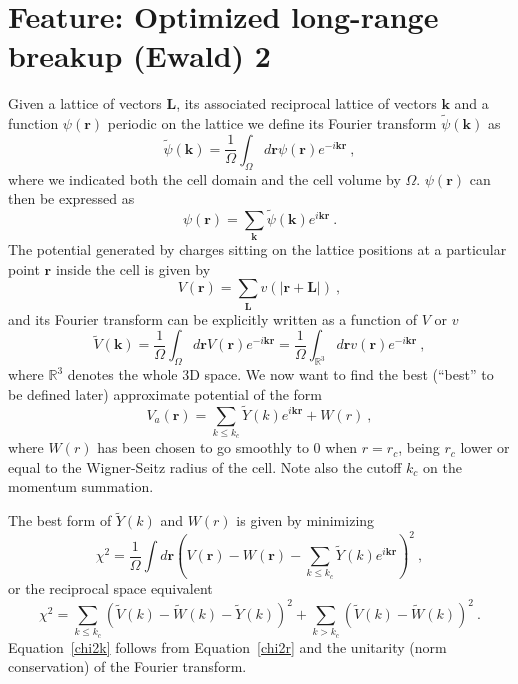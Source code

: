 %
\section{Feature: Optimized long-range breakup (Ewald) 2}


\newcommand{\rv}{\mathbf{r}}
\newcommand{\kv}{\mathbf{k}}
\newcommand{\Rv}{\mathbf{R}}
\newcommand{\Lv}{\mathbf{L}}
\newcommand{\Rc}{\mathcal{R}}
\newcommand{\tV}{\widetilde{V}}
\newcommand{\tW}{\widetilde{W}}
\newcommand{\tc}{\widetilde{c}}
\newcommand{\tY}{\widetilde{Y}}
\newcommand{\Nk}{N_{\text{knot}}}
\newcommand{\wk}{w_{\text{knot}}}

Given a lattice of vectors $\Lv$, its associated reciprocal
lattice of vectors $\kv$ and a function $\psi(\rv)$ periodic
on the lattice we define its Fourier transform $\widetilde{\psi}(\kv)$ as
\begin{equation}
\widetilde{\psi}(\kv)=\frac{1}{\Omega}\int_\Omega d\rv \psi(\rv) e^{-i\kv\rv}\:,
\end{equation}
where we indicated both the cell domain and the cell volume by $\Omega$. 
$\psi(\rv)$ can then be expressed as
\begin{equation}
\psi(\rv)=\sum_{\kv} \widetilde{\psi}(\kv)e^{i\kv\rv}\:.
\end{equation}
The potential generated by charges sitting on the lattice positions
at a particular point $\rv$ inside the cell is given by
\begin{equation}
V(\rv)=\sum_{\Lv}v(|\rv+\Lv|)\:,
\end{equation}
and its Fourier transform can be explicitly written as a function of $V$ or $v$
\begin{equation}
\widetilde{V}(\kv)=\frac{1}{\Omega}\int_\Omega d\rv V(\rv) e^{-i\kv\rv}=
\frac{1}{\Omega}\int_{\mathbb{R}^3} d\rv v(\rv) e^{-i\kv\rv}\:,
\end{equation}
where $\mathbb{R}^3$ denotes the whole 3D space.
We now want to find the best (``best'' to be defined later) approximate 
potential of the form
\begin{equation}
V_a(\rv)=\sum_{k\le k_c} \widetilde{Y}(k) e^{i\kv\rv} + W(r)\:,
\end{equation}
where $W(r)$ has been chosen to go smoothly to $0$ when $r=r_c$, being
$r_c$ lower or equal to the Wigner-Seitz radius of the cell. Note also
the cutoff $k_c$ on the momentum summation.

The best form of $\widetilde{Y}(k)$ and $W(r)$ is given by minimizing
\begin{equation}
  \chi^2=\frac{1}{\Omega}\int d\rv \left(V(\rv)-W(\rv)-
  \sum_{k\le k_c}\widetilde{Y}(k)e^{i\kv\rv}\right)^2
  \label{chi2r}\:,
\end{equation}
or the reciprocal space equivalent
\begin{equation}
  \chi^2=\sum_{k\le k_c}(\tV(k)-\tW(k)-\tY(k))^2+\sum_{k>k_c}(\tV(k)-\tW(k))^2
  \label{chi2k}\:.
\end{equation}
Equation~\ref{chi2k} follows from Equation~\ref{chi2r} and the unitarity
(norm conservation) of the Fourier transform.

